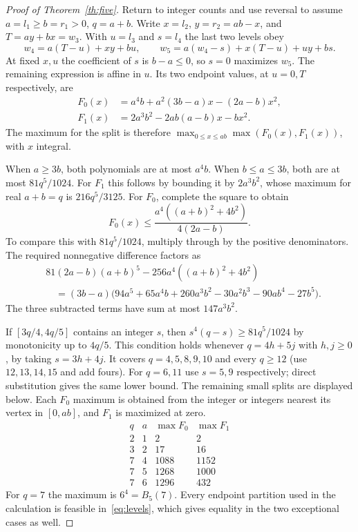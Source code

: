 \documentclass[11pt,a4paper]{article}
\begin{document}
\begin{proof}[Proof of Theorem~\ref{th:five}]
Return to integer counts and use reversal to assume $a=l_1\ge b=r_1>0$, $q=a+b$. Write $x=l_2$, $y=r_2=ab-x$, and $T=ay+bx=w_3$. With $u=l_3$ and $s=l_4$ the last two levels obey
\[
 w_4=a(T-u)+xy+bu,\qquad
 w_5=a(w_4-s)+x(T-u)+uy+bs.
\]
At fixed $x,u$ the coefficient of $s$ is $b-a\le0$, so $s=0$ maximizes $w_5$. The remaining expression is affine in $u$. Its two endpoint values, at $u=0,T$ respectively, are
\begin{align*}
 F_0(x)&=a^4b+a^2(3b-a)x-(2a-b)x^2,\\
 F_1(x)&=2a^3b^2-2ab(a-b)x-bx^2 .
\end{align*}
The maximum for the split is therefore $\max_{0\le x\le ab}\max(F_0(x),F_1(x))$, with $x$ integral.

When $a\ge3b$, both polynomials are at most $a^4b$. When $b\le a\le3b$, both are at most $81q^5/1024$. For $F_1$ this follows by bounding it by $2a^3b^2$, whose maximum for real $a+b=q$ is $216q^5/3125$. For $F_0$, complete the square to obtain
\[
 F_0(x)\le\frac{a^4((a+b)^2+4b^2)}{4(2a-b)}.
\]
To compare this with $81q^5/1024$, multiply through by the positive denominators. The required nonnegative difference factors as
\[
\begin{split}
 &81(2a-b)(a+b)^5-256a^4((a+b)^2+4b^2) \\
 &\quad=(3b-a)
 \bigl(94a^5+65a^4b+260a^3b^2-30a^2b^3-90ab^4-27b^5\bigr).
\end{split}
\]
The three subtracted terms have sum at most $147a^3b^2$.

If $[3q/4,4q/5]$ contains an integer $s$, then $s^4(q-s)\ge81q^5/1024$ by monotonicity up to $4q/5$. This condition holds whenever $q=4h+5j$ with $h,j\ge0$, by taking $s=3h+4j$. It covers $q=4,5,8,9,10$ and every $q\ge12$ (use $12,13,14,15$ and add fours). For $q=6,11$ use $s=5,9$ respectively; direct substitution gives the same lower bound. The remaining small splits are displayed below. Each $F_0$ maximum is obtained from the integer or integers nearest its vertex in $[0,ab]$, and $F_1$ is maximized at zero.
\[
\begin{array}{c|c|r|r}
q&a&\max F_0&\max F_1\\\hline
2&1&2&2\\
3&2&17&16\\
7&4&1088&1152\\
7&5&1268&1000\\
7&6&1296&432
\end{array}
\]
For $q=7$ the maximum is $6^4=B_5(7)$. Every endpoint partition used in the calculation is feasible in~\eqref{eq:levels}, which gives equality in the two exceptional cases as well.
\end{proof}
\end{document}
